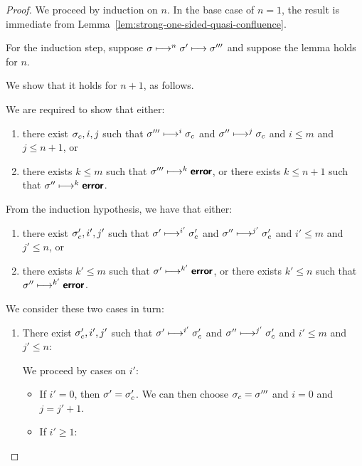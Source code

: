 \begin{proof}

  We proceed by induction on $n$.  In the base case of $n = 1$, the
  result is immediate from Lemma~\ref{lem:strong-one-sided-quasi-confluence}.

  For the induction step, suppose $\sigma \longmapsto^n \sigma'
  \longmapsto \sigma'''$ and suppose the lemma holds for $n$.

  We show that it holds for $n + 1$, as follows.

  We are required to show that either:
  \begin{enumerate}
  \item there exist $\sigma_c, i, j$ such that $\sigma''' \longmapsto^i
    \sigma_c$ and $\sigma'' \longmapsto^j \sigma_c$ and $i \leq m$ and $j
    \leq n + 1$, or
  \item there exists $k \leq m$ such that $\sigma''' \longmapsto^k
    \textbf{\textsf{error}}$, or there exists $k \leq n + 1$ such that $\sigma''
    \longmapsto^k \textbf{\textsf{error}}$.
  \end{enumerate}

  From the induction hypothesis, we have that either:
  \begin{enumerate}
  \item there exist $\sigma'_c, i', j'$ such that $\sigma'
    \longmapsto^{i'} \sigma'_c$ and $\sigma'' \longmapsto^{j'} \sigma'_c$
    and $i' \leq m$ and $j' \leq n$, or
  \item there exists $k' \leq m$ such that $\sigma' \longmapsto^{k'}
    \textbf{\textsf{error}}$, or there exists $k' \leq n$ such that $\sigma''
    \longmapsto^{k'} \textbf{\textsf{error}}$.
  \end{enumerate}

  We consider these two cases in turn:

  \begin{enumerate}
  \item There exist $\sigma'_c, i', j'$ such that $\sigma'
    \longmapsto^{i'} \sigma'_c$ and $\sigma'' \longmapsto^{j'} \sigma'_c$
    and $i' \leq m$ and $j' \leq n$:

    We proceed by cases on $i'$:
    \begin{itemize}

    \item If $i' = 0$, then $\sigma' = \sigma_c'$.  We can then choose
      $\sigma_c = \sigma'''$ and $i = 0$ and $j = j' + 1$.

    \item If $i' \geq 1$:


\end{itemize}
\end{enumerate}
\end{proof}
